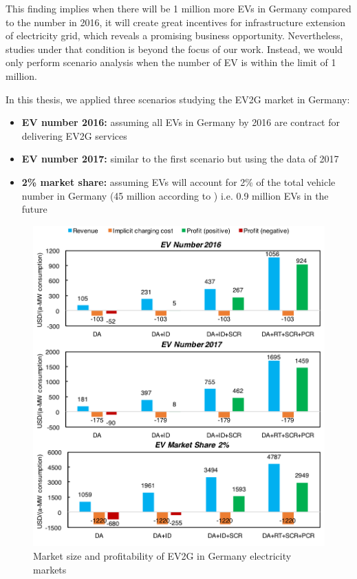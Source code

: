 This finding implies when there will be 1 million more EVs in Germany compared to the number in 2016, it will create great incentives for infrastructure extension of electricity grid, which reveals a promising business opportunity. Nevertheless, studies under that condition is beyond the focus of our work. Instead, we would only perform scenario analysis when the number of EV is within the limit of 1 million. 

In this thesis, we applied three scenarios studying the EV2G market in Germany:

\begin{itemize}
	\item \textbf{EV number 2016:} assuming all  EVs in Germany by 2016 are contract for delivering EV2G services
	\item \textbf{EV number 2017:} similar to the first scenario but using the data of 2017
	\item \textbf{2\% market share:} assuming EVs will account for 2\% of the total vehicle number in Germany (45 million according to \cite{Eurostat_de_v}) i.e. 0.9 million EVs in the future
\end{itemize}


\begin{figure}[h!]
	\centering
	\includegraphics[width=0.95\linewidth]{Figures/Germany_EV_profit}
	\caption{Market size and profitability of EV2G in Germany electricity markets}
	\label{fig:Germany_EV}
\end{figure}

